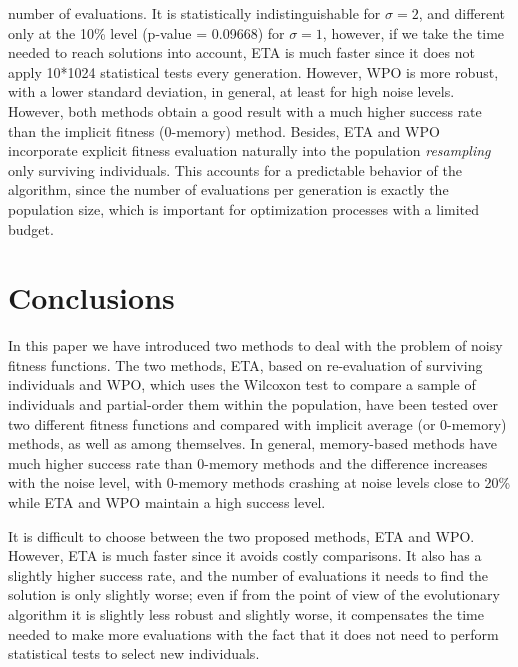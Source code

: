 \documentclass{llncs}
\begin{document}
number of evaluations. It is statistically indistinguishable for
$\sigma=2$, and different only at the 10\% level (p-value = 0.09668)
for $\sigma=1$, however, if we take the time needed to reach solutions
into account, ETA is much faster since it does not apply 10*1024
statistical tests every generation. 
However, WPO is more robust, with
a lower standard deviation, in general, at least for high noise
levels. However, both methods obtain a good result with a much higher
success rate than the implicit fitness (0-memory) method. Besides, ETA and WPO 
incorporate explicit fitness evaluation naturally into the population
{\em resampling} only surviving individuals. This accounts for a
predictable behavior of the algorithm, since the number of evaluations
per generation is exactly the population size, which is important for
optimization processes with a limited budget. 


\section{Conclusions}

In this paper we have introduced two methods to deal with the problem
of noisy fitness functions. The two methods, {\sf ETA}, based on
re-evaluation of surviving individuals and {\sf WPO}, which uses the
Wilcoxon test to compare a sample of individuals and partial-order
them within the population, 
 have been tested over two
different fitness functions and compared with implicit average (or
0-memory) methods, as well as among themselves. In general,
memory-based methods have much higher success rate than 0-memory
methods and the difference increases with the noise level, with
0-memory methods crashing at noise levels close to 20\% while ETA and
WPO maintain a high success level.

It is difficult to choose between the two proposed methods, ETA and
WPO. However, ETA is much faster since it avoids costly
comparisons. It also has a slightly higher success rate, and the
number of evaluations it needs to find the solution is only slightly
worse; even if from the point of view of the evolutionary algorithm it
is slightly less robust and slightly worse, it compensates the time
needed to make more evaluations with the fact that it does not need to
perform statistical tests to select new individuals.
\end{document}
